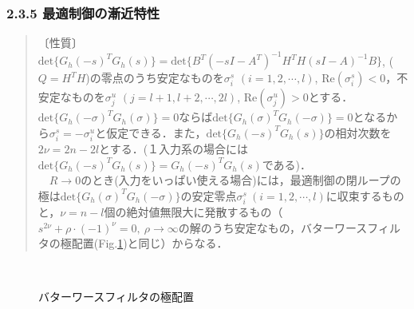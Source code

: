 \begin{frame}[t]
\frametitle{2.3.5 最適制御の漸近特性}
\small

\begin{quote}
〔性質〕 $ \mbox{det} \{G_h(-s)^T G_h(s)\}= \mbox{det}\{B^T (-sI - A^T)^{-1}H^T H (sI - A)^{-1} B\}$, ($Q=H^T H$)の零点のうち安定なものを$\sigma^s_i$ $(i=1,2,\cdots,l)$, $\mbox{Re}(\sigma^s_i) < 0$，不安定なものを$\sigma^u_j$ $(j=l+1,l+2,\cdots,2l)$, $\mbox{Re}(\sigma^u_j) > 0$とする．$ \mbox{det} \{G_h(-\sigma)^T G_h(\sigma)\}=0$ならば$ \mbox{det} \{G_h(\sigma)^T G_h(-\sigma)\}=0$となるから$\sigma^s_i=-\sigma^u_i$と仮定できる．また，$ \mbox{det} \{G_h(-s)^T G_h(s)\}$の相対次数を$2\nu=2n-2l$とする．(１入力系の場合には$ \mbox{det} \{G_h(-s)^T G_h(s)\} = G_h(-s)^T G_h(s)$である)．
\\{}
\ \ 
$R \rightarrow 0$のとき(入力をいっぱい使える場合)には，最適制御の閉ループの極は$ \mbox{det} \{G_h(\sigma)^T G_h(-\sigma)\}$の安定零点$\sigma^s_i\ (i=1,2,\cdots, l)$に収束するものと，$\nu=n-l$個の絶対値無限大に発散するもの（$s^{2\nu}+\rho \cdot (-1)^\nu=0,\  \rho \rightarrow \infty$の解のうち安定なもの，バターワースフィルタの極配置(Fig.\ref{fig:butterworth})と同じ）からなる．
\end{quote}

\begin{figure}[htbp]
 \begin{center}
  \caption{バターワースフィルタの極配置}
  \label{fig:butterworth}
 \end{center}
\end{figure}


\end{frame}

